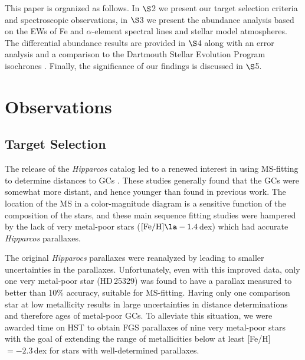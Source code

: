 \documentclass[revtex4]{emulateapj}
\begin{document}
This paper is organized as follows.  In $\S$2 we present our target selection criteria and spectroscopic observations, in $\S$3 we present the abundance analysis based on the EWs of Fe and $\alpha$-element spectral lines and stellar model atmospheres.  The differential abundance results are provided in $\S$4 along with an error analysis and a comparison to the Dartmouth Stellar Evolution Program isochrones \citep[hereafter DSEP]{Dott2008}.  Finally, the significance of our findings is discussed in $\S$5.

\section{Observations \label{sec:Obs}}
\subsection{Target Selection}
The release of the \emph{Hipparcos} catalog \citep{hip} led to a renewed interest in using MS-fitting to determine distances to GCs \citep[e.g.][]{reid97,gratton97,pont98,chaboyer98,Carr2000,grundahl02,Grat2003}.  These studies generally found that the GCs were somewhat more distant, and hence younger than found in previous work.  The location of the MS in a color-magnitude diagram is a sensitive function of the composition of the stars, and these main sequence fitting studies were hampered by the lack of very metal-poor stars  ($\mathrm{[Fe/H]}\la-1.4$\,dex) which had accurate \emph{Hipparcos} parallaxes.

The original \emph{Hipparocs} parallaxes were reanalyzed by \citet{Leeu2007} leading to smaller uncertainties in the parallaxes.  Unfortunately, even with this improved data, only one very metal-poor star (HD\,25329) was found to have a parallax measured to better than 10\% accuracy, suitable for MS-fitting.  Having only one comparison star at low metallicity results in large uncertainties in distance determinations and therefore ages of metal-poor GCs.  To alleviate this situation, we were awarded time on HST to obtain FGS parallaxes of nine very metal-poor stars with the goal of extending the range of metallicities below at least [Fe/H] $=-2.3\,$dex for stars with well-determined parallaxes.
\end{document}
